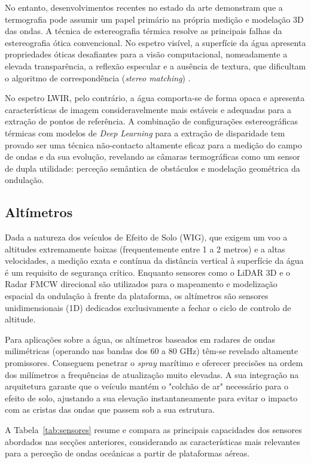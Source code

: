 \documentclass[11pt,a4paper]{article}
\begin{document}
No entanto, desenvolvimentos recentes no estado da arte demonstram que a termografia pode assumir um papel primário na própria medição e modelação 3D das ondas. A técnica de estereografia térmica resolve as principais falhas da estereografia ótica convencional. No espetro visível, a superfície da água apresenta propriedades óticas desafiantes para a visão computacional, nomeadamente a elevada transparência, a reflexão especular e a ausência de textura, que dificultam o algoritmo de correspondência (\textit{stereo matching}) \parencite{li2025thermal}. 

No espetro LWIR, pelo contrário, a água comporta-se de forma opaca e apresenta características de imagem consideravelmente mais estáveis e adequadas para a extração de pontos de referência. A combinação de configurações estereográficas térmicas com modelos de \textit{Deep Learning} para a extração de disparidade tem provado ser uma técnica não-contacto altamente eficaz para a medição do campo de ondas e da sua evolução, revelando as câmaras termográficas como um sensor de dupla utilidade: perceção semântica de obstáculos e modelação geométrica da ondulação.

\subsection{Altímetros}
Dada a natureza dos veículos de Efeito de Solo (WIG), que exigem um voo a altitudes extremamente baixas (frequentemente entre 1 a 2 metros) e a altas velocidades, a medição exata e contínua da distância vertical à superfície da água é um requisito de segurança crítico. Enquanto sensores como o LiDAR 3D e o Radar FMCW direcional são utilizados para o mapeamento e modelização espacial da ondulação à frente da plataforma, os altímetros são sensores unidimensionais (1D) dedicados exclusivamente a fechar o ciclo de controlo de altitude.

Para aplicações sobre a água, os altímetros baseados em radares de ondas milimétricas (operando nas bandas dos 60 a 80 GHz) têm-se revelado altamente promissores. Conseguem penetrar o \textit{spray} marítimo e oferecer precisões na ordem dos milímetros a frequências de atualização muito elevadas. A sua integração na arquitetura garante que o veículo mantém o "colchão de ar" necessário para o efeito de solo, ajustando a sua elevação instantaneamente para evitar o impacto com as cristas das ondas que passem sob a sua estrutura.

A Tabela~\ref{tab:sensores} resume e compara as principais capacidades dos sensores
abordados nas secções anteriores, considerando as características mais relevantes
para a perceção de ondas oceânicas a partir de plataformas aéreas.
\end{document}
